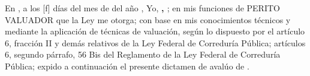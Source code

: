 
En  \lugarInforme{}, 
a los \numberstringnum{\diainforme}[f] d\'ias del mes de \monthname[\mesinforme] 
del a\~no \numberstringnum{\annoinforme}, 
Yo, \textbf{\textcolor{principal}{\nombrePerito, \descripcionPerito}}; 
en mis funciones de PERITO VALUADOR que la Ley  me otorga; con base en mis 
conocimientos t\'ecnicos y mediante la aplicaci\'on de t\'ecnicas de 
valuaci\'on, seg\'un lo dispuesto por el art\'iculo 6, fracci\'on II y dem\'as 
relativos de la Ley Federal de Corredur\'ia P\'ublica; art\'iculos 6, segundo 
p\'arrafo, 56 Bis del Reglamento de la Ley Federal de Corredur\'ia P\'ublica; 
expido a continuaci\'on el presente dictamen de avalúo de 
\textcolor{principal}{\tipoAvaluo}.\\

